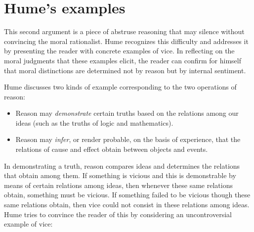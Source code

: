 


\section{Hume's examples}\label{sec:hume_s_examples} %

This second argument is a piece of abstruse reasoning that may silence without convincing the moral rationalist. Hume recognizes this difficulty and addresses it by presenting the reader with concrete examples of vice. In reflecting on the moral judgments that these examples elicit, the reader can confirm for himself that moral distinctions are determined not by reason but by internal sentiment.

Hume discusses two kinds of example corresponding to the two operations of reason:

\begin{itemize}
	\item Reason may \emph{demonstrate} certain truths based on the relations among our ideas (such as the truths of logic and mathematics).
	\item Reason may \emph{infer}, or render probable, on the basis of experience, that the relations of cause and effect obtain between objects and events.
\end{itemize}

In demonstrating a truth, reason compares ideas and determines the relations that obtain among them. If something is vicious and this is demonstrable by means of certain relations among ideas, then whenever these same relations obtain, something must be vicious. If something failed to be vicious though these same relations obtain, then vice could not consist in these relations among ideas. Hume tries to convince the reader of this by considering an uncontroversial example of vice:

